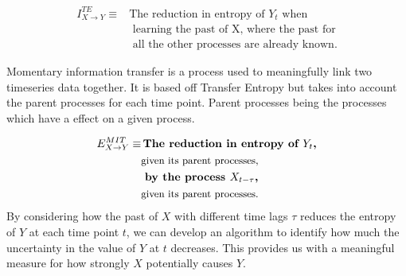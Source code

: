 \begin{align*}
I^{TE}_{X\rightarrow Y}\equiv&\text{The reduction in entropy of $Y_t$ when}\\
&\text{ learning the past of X, where the past for}\\
&\text{ all the other processes are already known.}
\end{align*}

Momentary information transfer is a process used to meaningfully link two timeseries data together. It is based off Transfer Entropy but takes into account the parent processes for each time point. Parent processes being the processes which have a effect on a given process.

\begin{align*}
E^{MIT}_{X\rightarrow Y}\equiv&\,
\text{\textbf{The reduction in entropy of $Y_t$,}}\\
&\text{\small given its parent processes,}\\
&\text{ \textbf{by the process $X_{t-\tau}$,}}\\
&\text{\small given its parent processes.}
\end{align*}
By considering how the past of $X$ with different time lags $\tau$ reduces the entropy of $Y$ at each time point $t$, we can develop an algorithm to identify how much the uncertainty in the value of $Y$ at $t$ decreases. This provides us with a meaningful measure for how strongly $X$ potentially causes $Y$.